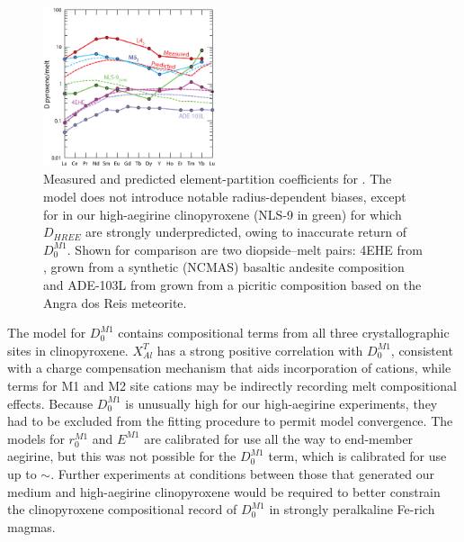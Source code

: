 \documentclass[final,authoryear,3p,times,twocolumn]{elsarticle}
\begin{document}
	   	   \begin{figure}[bt]
        \begin{center}
        \includegraphics[width=0.45\textwidth]{14_SpiderDTest.eps}
        \caption[Measured (solid line) and predicted (dashed line) element-partitioning coefficients for ]{Measured and predicted element-partition coefficients for . The model does not introduce notable radius-dependent biases, except for in our high-aegirine clinopyroxene (NLS-9 in green) for which $D_{HREE}$ are strongly underpredicted, owing to inaccurate return of $D_0^{M1}$. Shown for comparison are two diopside--melt pairs: 4EHE from \citet{Hill2000}, grown from a synthetic (NCMAS) basaltic andesite composition and ADE-103L from \citet{Lofgren2006} grown from a picritic composition based on the Angra dos Reis meteorite.}
        \label{14_REEradius}
        \end{center}
        \end{figure}

The model for $D_0^{M1}$ contains compositional terms from all three crystallographic sites in clinopyroxene. $X^T_{Al}$ has a strong positive correlation with $D_0^{M1}$, consistent with a charge compensation mechanism that aids incorporation of  cations, while terms for M1  and M2 site cations may be indirectly recording melt compositional effects. Because $D_0^{M1}$ is unusually high for our high-aegirine experiments, they had to be excluded from the fitting procedure to permit model convergence. The models for $r_0^{M1}$ and $E^{M1}$ are calibrated for use all the way to end-member aegirine, but this was not possible for the $D_0^{M1}$ term, which is calibrated for use up to $\sim$. Further experiments at conditions between those that generated our medium and high-aegirine clinopyroxene would be required to better constrain the clinopyroxene compositional record of $D_0^{M1}$ in strongly peralkaline Fe-rich magmas.
\end{document}
